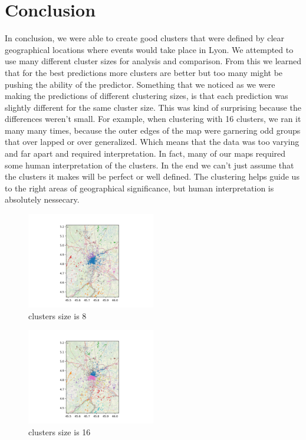 \documentclass{article}
\begin{document}
\section*{Conclusion}
In conclusion, we were able to create good clusters that were defined by clear geographical locations where events would take place in Lyon. We attempted to use many different cluster sizes for analysis and comparison. From this we learned that for the best predictions more clusters are better but too many might be pushing the ability of the predictor. Something that we noticed as we were making the predictions of different clustering sizes, is that each prediction was slightly different for the same cluster size. This was kind of surprising because the differences weren't small. For example, when clustering with 16 clusters, we ran it many many times, because the outer edges of the map were garnering odd groups that over lapped or over generalized. Which means that the data was too varying and far apart and required interpretation. In fact, many of our maps required some human interpretation of the clusters. In the end we can't just assume that the clusters it makes will be perfect or well defined. The clustering helps guide us to the right areas of geographical significance, but human interpretation is absolutely nessecary. 


\begin{figure}[!h]
  \centering
  \includegraphics[width=0.5\textwidth]{small_clusters_8.png}
  \caption{clusters size is 8}
  \label{fig:clusters_8}
\end{figure}


\begin{figure}[!h]
  \centering
  \includegraphics[width=0.5\textwidth]{medium_clusters_16.png}
  \caption{clusters size is 16}
	\label{fig:clusters_16}
\end{figure}
\end{document}
